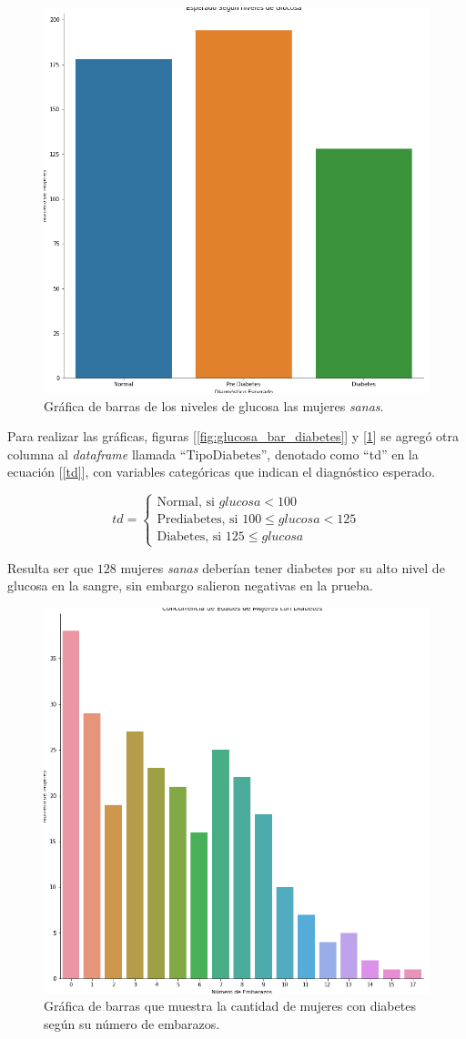 \documentclass{article}
\begin{document}
\begin{figure}[H]
	\centering
	\includegraphics[width=0.65\linewidth]{glucosa_bar_sanas.png}
	\caption{Gráfica de barras de los niveles de glucosa las mujeres \emph{sanas}.}%
	\label{fig:glucosa_bar_sanas}
\end{figure}

Para realizar las gráficas, figuras [\ref{fig:glucosa_bar_diabetes}] y [\ref{fig:glucosa_bar_sanas}] se agregó otra columna al \emph{dataframe} llamada ``TipoDiabetes'', denotado como ``td'' en la ecuación [\ref{td}], con variables categóricas que indican el diagnóstico esperado.

\begin{equation}\label{td}
	td=
	\begin{cases}
		\text{Normal, si      } glucosa < 100\\
		\text{Prediabetes, si   } 100 \leq glucosa < 125\\
		\text{Diabetes, si  } 125 \leq glucosa
	\end{cases}
\end{equation}

Resulta ser que $128$ mujeres \emph{sanas} deberían tener diabetes por su alto nivel de glucosa en la sangre, sin embargo salieron negativas en la prueba.

\begin{figure}[H]
	\centering
	\includegraphics[width=0.65\linewidth]{emb_diabetes.png}
	\caption{Gráfica de barras que muestra la cantidad de mujeres con diabetes según su número de embarazos.}%
	\label{fig:emb_diabetes}
\end{figure}
\end{document}
